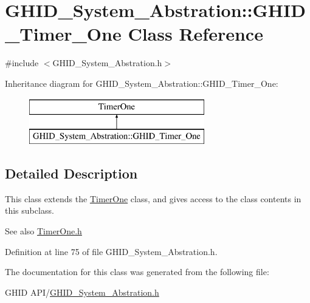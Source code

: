 \hypertarget{class_g_h_i_d___system___abstration_1_1_g_h_i_d___timer___one}{\section{\-G\-H\-I\-D\-\_\-\-System\-\_\-\-Abstration\-:\-:\-G\-H\-I\-D\-\_\-\-Timer\-\_\-\-One \-Class \-Reference}
\label{class_g_h_i_d___system___abstration_1_1_g_h_i_d___timer___one}
}


{\ttfamily \#include $<$\-G\-H\-I\-D\-\_\-\-System\-\_\-\-Abstration.\-h$>$}

\-Inheritance diagram for \-G\-H\-I\-D\-\_\-\-System\-\_\-\-Abstration\-:\-:\-G\-H\-I\-D\-\_\-\-Timer\-\_\-\-One\-:\begin{figure}[H]
\begin{center}
\leavevmode
\includegraphics[height=2.000000cm]{class_g_h_i_d___system___abstration_1_1_g_h_i_d___timer___one}
\end{center}
\end{figure}


\subsection{\-Detailed \-Description}
\-This class extends the \hyperlink{class_timer_one}{\-Timer\-One} class, and gives access to the class contents in this subclass.

\begin{DoxySeeAlso}{\-See also}
\hyperlink{_timer_one_8h}{\-Timer\-One.\-h} 
\end{DoxySeeAlso}


\-Definition at line 75 of file \-G\-H\-I\-D\-\_\-\-System\-\_\-\-Abstration.\-h.



\-The documentation for this class was generated from the following file\-:\begin{DoxyCompactItemize}
\item 
\-G\-H\-I\-D A\-P\-I/\hyperlink{_g_h_i_d___system___abstration_8h}{\-G\-H\-I\-D\-\_\-\-System\-\_\-\-Abstration.\-h}\end{DoxyCompactItemize}

